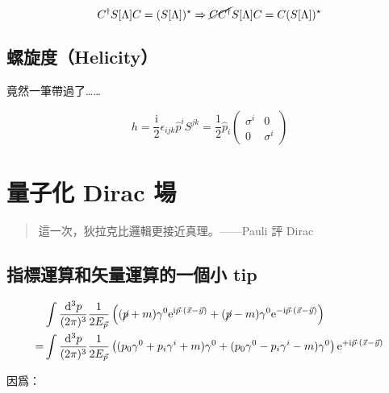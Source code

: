 \documentclass{article}
\begin{document}
$$
C^{\dagger}S[\Lambda]C=(S[\Lambda])^{\star}\Rightarrow\cancel{CC^{\dagger}}S[\Lambda]C=C(S[\Lambda])^{\star}
$$

\subsection{螺旋度（Helicity）}

竟然一筆帶過了……

$$
h=\frac{\mathrm{i}}{2}\epsilon_{ijk}\hat{p}^iS^{jk}=\frac{1}{2}\hat{p}_i
\begin{pmatrix}
\sigma^i & 0 \\ 0 & \sigma^i
\end{pmatrix}
$$

\section{量子化 Dirac 場}

\begin{quote}
這一次，狄拉克比邏輯更接近真理。——Pauli 評 Dirac
\end{quote}

\subsection{指標運算和矢量運算的一個小 tip}

$$
\begin{aligned}
& \int\frac{\mathrm{d}^3p}{(2\pi)^3}\frac{1}{2E_{\vec{p}}}\left((\cancel{p}+m)\gamma^0\mathrm{e}^{\mathrm{i}\vec{p}\cdot(\vec{x}-\vec{y})}+(\cancel{p}-m)\gamma^0\mathrm{e}^{-\mathrm{i}\vec{p}\cdot(\vec{x}-\vec{y})}\right) \\
= & \int\frac{\mathrm{d}^3p}{(2\pi)^3}\frac{1}{2E_{\vec{p}}}\left((p_0\gamma^0+p_i\gamma^i+m)\gamma^0+(p_0\gamma^0-p_i\gamma^i-m)\gamma^0\right)\mathrm{e}^{+\mathrm{i}\vec{p}\cdot(\vec{x}-\vec{y})}
\end{aligned}
$$

因爲：
\end{document}
